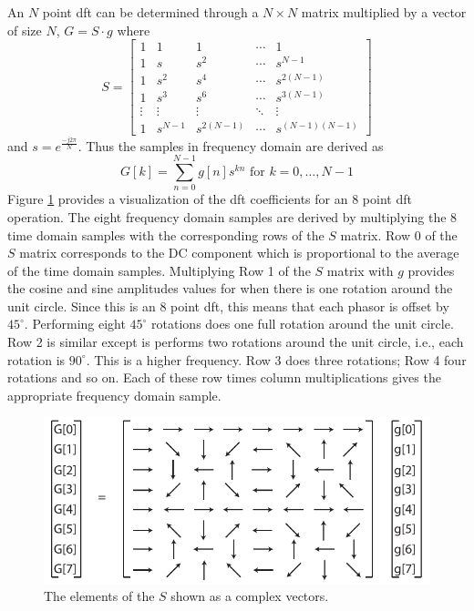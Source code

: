 An $N$ point \gls{dft} can be determined through a $N \times N$ matrix multiplied by a vector of size $N$, $G = S \cdot g$ where
\begin{equation}
S =
 \begin{bmatrix}
 \label{eq:Smatrix}
  1 & 1 & 1 & \cdots & 1 \\
  1 & s & s^2 & \cdots & s^{N-1} \\
  1 & s^2 & s^4 & \cdots & s^{2(N-1)} \\
  1 & s^3 & s^6 & \cdots & s^{3(N-1)} \\
  \vdots  & \vdots  & \vdots &\ddots & \vdots  \\
  1 & s^{N-1} & s^{2(N-1)}&\cdots & s^{(N-1)(N-1)}
 \end{bmatrix}
\end{equation} and $s = e^{\frac{-j 2 \pi}{N}}$.   Thus the samples in frequency domain are derived as 
\begin{equation}
G[k] = \displaystyle\sum\limits_{n=0}^{N-1} g[n] s^{kn} \text{ for } k = 0,\dots, N-1
\end{equation}
Figure \ref{fig:dft_visualization} provides a visualization of the \gls{dft} coefficients for an 8 point \gls{dft} operation. The eight frequency domain samples are derived by multiplying the 8 time domain samples with the corresponding rows of the $S$ matrix. Row 0 of the $S$ matrix corresponds to the DC component which is proportional to the average of the time domain samples. Multiplying Row 1 of the $S$ matrix with $g$ provides the cosine and sine amplitudes values for when there is one rotation around the unit circle. Since this is an 8 point \gls{dft}, this means that each phasor is offset by $45^{\circ}$. Performing eight $45^{\circ}$ rotations does one full rotation around the unit circle. Row 2 is similar except is performs two rotations around the unit circle, i.e., each rotation is $90^{\circ}$. This is a higher frequency. Row 3 does three rotations; Row 4 four rotations and so on. Each of these row times column multiplications gives the appropriate frequency domain sample. 

\begin{figure}
\centering
\includegraphics[width= 0.8 \textwidth]{images/dft-visualization}
\caption{ The elements of the $S$ shown as a complex vectors.  }
\label{fig:dft_visualization}
\end{figure}

